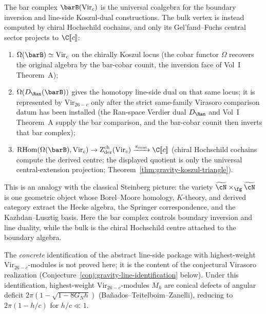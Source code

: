 \begin{remark}
\label{rem:gravity-steinberg}
The bar complex $\barB(\mathrm{Vir}_c)$ is the universal coalgebra for
the boundary inversion and line-side Koszul-dual constructions.  The
bulk vertex is instead computed by chiral Hochschild cochains, and only
its Gel'fand--Fuchs central sector projects to \(\C[\![c]\!]\):
\begin{enumerate}[label=\textup{(\roman*)}]
\item $\Omega(\barB) \simeq \mathrm{Vir}_c$ on the chirally
 Koszul locus (the cobar functor $\Omega$ recovers the
 original algebra by the bar-cobar counit, the inversion face of
 Vol~I Theorem~A);
\item $\Omega(D_{\Ran}(\barB))$ gives the homotopy line-side dual on
 that same locus; it is represented by \(\mathrm{Vir}_{26-c}\) only
 after the strict same-family Virasoro comparison datum has been
 installed (the Ran-space Verdier dual \(D_{\Ran}\) and Vol~I
 Theorem~A supply the bar comparison, and the bar-cobar counit then
 inverts that bar complex);
\item $\RHom(\Omega(\barB), \mathrm{Vir}_c)
 \to \Zder^{\mathrm{ch}}(\mathrm{Vir}_c)
 \xrightarrow{\pi_{\mathrm{cent}}}\C[\![c]\!]$ (chiral Hochschild
 cochains compute the derived centre; the displayed quotient is only
 the universal central-extension projection;
 Theorem~\ref{thm:gravity-koszul-triangle}).
\end{enumerate}
This is an analogy with the classical Steinberg picture: the variety
$\widetilde{\cN} \times_\fg \widetilde{\cN}$ is one geometric
object whose Borel--Moore homology, $K$-theory, and derived
category extract the Hecke algebra, the Springer correspondence,
and the Kazhdan--Lusztig basis. Here the bar complex controls
boundary inversion and line duality, while the bulk is the chiral
Hochschild centre attached to the boundary algebra.
\end{remark}

\begin{remark}
\label{rem:gravity-line-virasoro-realization}
The \emph{concrete} identification of the abstract line-side package
with highest-weight $\mathrm{Vir}_{26-c}$-modules is not proved here;
it is the content of the conjectural Virasoro realization
(Conjecture~\ref{conj:gravity-line-identification} below).
Under this identification, highest-weight
$\mathrm{Vir}_{26-c}$-modules $M_h$ are conical defects of angular deficit
$2\pi(1-\sqrt{1-8G_Nh})$
(Ba\~nados--Teitelboim--Zanelli), reducing to
$2\pi(1-h/c)$ for $h/c \ll 1$.
\end{remark}


